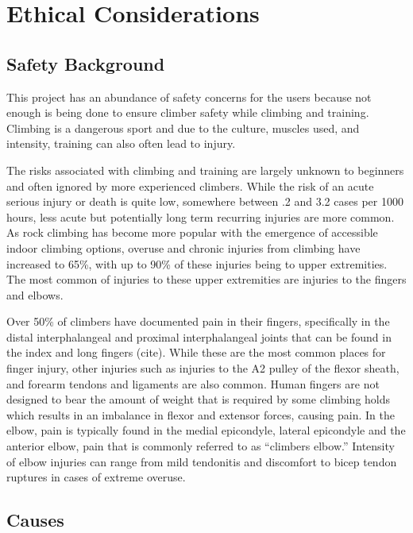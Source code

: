 \documentclass[10pt,twocolumn]{article}
\begin{document}
\section{Ethical Considerations}

\subsection{Safety Background}
    This project has an abundance of safety concerns for the users because not enough is being done to ensure climber safety while climbing and training. Climbing is a dangerous sport and due to the culture, muscles used, and intensity, training can also often lead to injury.  
	
	The risks associated with climbing and training are largely unknown to beginners and often ignored by more experienced climbers. While the risk of an acute serious injury or death is quite low, somewhere between .2 and 3.2 cases per 1000 hours, less acute but potentially long term recurring injuries are more common. As rock climbing has become more popular with the emergence of accessible indoor climbing options, overuse and chronic injuries from climbing have increased to 65\%, with up to 90\% of these injuries being to upper extremities. The most common of injuries to these upper extremities are injuries to the fingers and elbows. \cite{meyers_rock_nodate}

    Over 50\% of climbers have documented pain in their fingers, specifically in the distal interphalangeal and proximal interphalangeal joints that can be found in the index and long fingers (cite). \cite{meyers_rock_nodate} While these are the most common places for finger injury, other injuries such as injuries to the A2 pulley of the flexor sheath, and forearm tendons and ligaments are also common. Human fingers are not designed to bear the amount of weight that is required by some climbing holds which results in an imbalance in flexor and extensor forces, causing pain. In the elbow, pain is typically found in the medial epicondyle, lateral epicondyle and the anterior elbow, pain that is commonly referred to as “climbers elbow.” Intensity of elbow injuries can range from mild tendonitis and discomfort to bicep tendon ruptures in cases of extreme overuse. \cite{meyers_rock_nodate}

\subsection{Causes}
\end{document}
